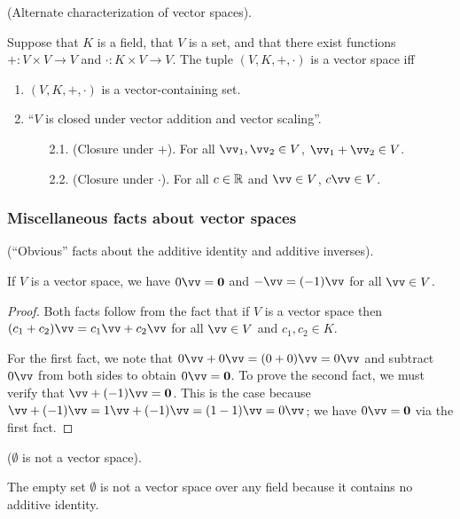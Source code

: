 \begin{theorem}
    (Alternate characterization of vector spaces).
    
    Suppose that $K$ is a field, that $V$ is a set, and that there exist functions $+:V \times V \rightarrow V$ and $\cdot:K \times V \rightarrow V$. The tuple $(V, K, +, \cdot)$ is a vector space iff
    
    \begin{enumerate}
        \item $(V, K, +, \cdot)$ is a vector-containing set.
        \item ``$V$ is closed under vector addition and vector scaling''.
        \begin{enumerate}
            \item[2.1.] (Closure under $+$). For all $\vv_1, \vv_2 \in V$, $\vv_1 + \vv_2 \in V$.
            \item[2.2.] (Closure under $\cdot$). For all $c \in \mathbb{R}$ and $\vv \in V$, $c \vv \in V$.
        \end{enumerate}
    \end{enumerate}
\end{theorem}

\subsubsection*{Miscellaneous facts about vector spaces}

\begin{theorem}
    (``Obvious'' facts about the additive identity and additive inverses).
    
    If $V$ is a vector space, we have $0 \vv = \mathbf{0}$ and $-\vv = (-1) \vv$ for all $\vv \in V$.
\end{theorem}

\begin{proof}
   Both facts follow from the fact that if $V$ is a vector space then $(c_1 + c_2)\vv = c_1 \vv + c_2 \vv$ for all $\vv \in V$ and $c_1, c_2 \in K$.
   
   For the first fact, we note that $0 \vv + 0 \vv = (0 + 0) \vv = 0 \vv$ and subtract $0 \vv$ from both sides to obtain $0 \vv = \mathbf{0}$. To prove the second fact, we must verify that $\vv + (-1) \vv = \mathbf{0}$. This is the case because $\vv + (-1) \vv = 1 \vv + (-1) \vv = (1 - 1) \vv = 0 \vv$; we have $0 \vv = \mathbf{0}$ via the first fact.
\end{proof}

\begin{remark}
    ($\emptyset$ is not a vector space).
    
    The empty set $\emptyset$ is not a vector space over any field because it contains no additive identity.
\end{remark}

